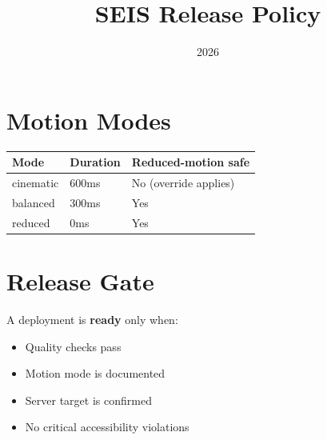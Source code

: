 \documentclass{article}
\title{SEIS Release Policy}
\date{2026}
\begin{document}
\maketitle

\section{Motion Modes}
\begin{tabular}{lll}
  \toprule
  Mode      & Duration & Reduced-motion safe \\
  \midrule
  cinematic & 600ms    & No (override applies) \\
  balanced  & 300ms    & Yes \\
  reduced   & 0ms      & Yes \\
  \bottomrule
\end{tabular}

\section{Release Gate}
A deployment is \textbf{ready} only when:
\begin{itemize}
  \item Quality checks pass
  \item Motion mode is documented
  \item Server target is confirmed
  \item No critical accessibility violations
\end{itemize}
\end{document}
